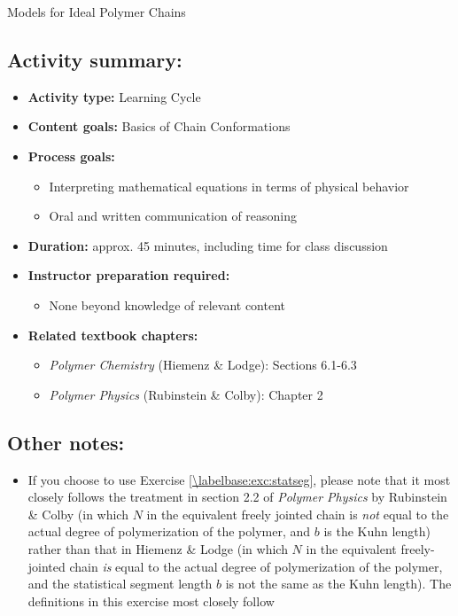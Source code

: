 \begin{activity}{Models for Ideal Polymer Chains}
\begin{instructornotes}
	\subsection*{Activity summary:}
	\begin{itemize}
		\item \textbf{Activity type:} Learning Cycle
		\item \textbf{Content goals:} Basics of Chain Conformations
		\item \textbf{Process goals:} %
			\begin{itemize}
				\item Interpreting mathematical equations in terms of physical behavior
				\item Oral and written communication of reasoning
			\end{itemize}
		\item \textbf{Duration:} approx. 45 minutes, including time for class discussion
		\item \textbf{Instructor preparation required:} 
			\begin{itemize}
				\item None beyond knowledge of relevant content
			\end{itemize}
		\item \textbf{Related textbook chapters:}
			\begin{itemize}
				\item \emph{Polymer Chemistry} (Hiemenz \& Lodge): Sections 6.1-6.3
				\item \emph{Polymer Physics} (Rubinstein \& Colby): Chapter 2
			\end{itemize}
	\end{itemize}
	
	\subsection*{Other notes:}
	
		\begin{itemize}
		\item If you choose to use Exercise \ref{\labelbase:exc:statseg}, please note that it most closely follows the treatment in section 2.2 of \emph{Polymer Physics} by Rubinstein \& Colby (in which $N$ in the equivalent freely jointed chain is \emph{not} equal to the actual degree of polymerization of the polymer, and $b$ is the Kuhn length) rather than that in Hiemenz \& Lodge (in which $N$ in the equivalent freely-jointed chain \emph{is} equal to the actual degree of polymerization of the polymer, and the statistical segment length $b$ is not the same as the Kuhn length).  The definitions in this exercise most closely follow
		\end{itemize}


\end{instructornotes}
\end{activity}
